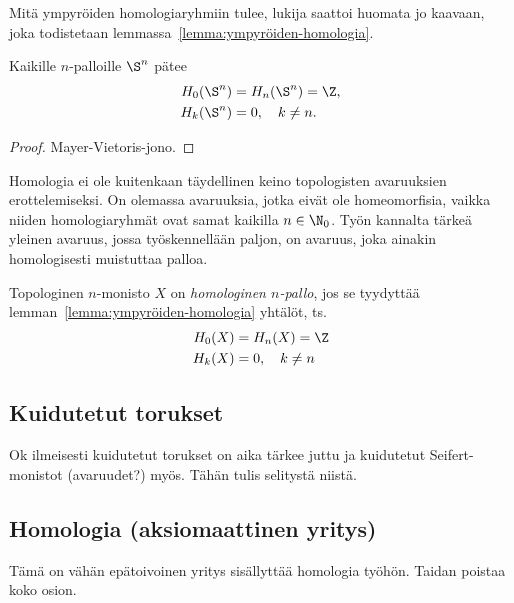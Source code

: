 Mitä ympyröiden homologiaryhmiin tulee, lukija saattoi huomata jo kaavaan, joka todistetaan lemmassa~\ref{lemma:ympyröiden-homologia}.
\begin{lemma}
    \label{lemma:ympyröiden-homologia}
    Kaikille $n$-palloille $\S^n$ pätee
    \begin{align*}
        H_0(\S^n)&=H_n(\S^n)=\Z, \\
        H_k(\S^n)&=0,\quad k\ne n.
    \end{align*}
\end{lemma}
\begin{proof}
    Mayer-Vietoris-jono.
\end{proof}
Homologia ei ole kuitenkaan täydellinen keino topologisten avaruuksien erottelemiseksi. On olemassa avaruuksia, jotka eivät ole homeomorfisia, vaikka niiden homologiaryhmät ovat samat kaikilla $n\in\N_0$. Työn kannalta tärkeä yleinen avaruus, jossa työskennellään paljon, on avaruus, joka ainakin homologisesti muistuttaa palloa.
\begin{maaritelma}
    \label{maar:homologinen-n-pallo}
    Topologinen $n$-monisto $X$ on \emph{homologinen $n$-pallo}, jos se tyydyttää lemman~\ref{lemma:ympyröiden-homologia} yhtälöt, ts.
    \begin{align*}
        H_0(X)&=H_n(X)=\Z \\
        H_k(X)&=0,\quad k\ne n
    \end{align*}
\end{maaritelma}

\subsection{Kuidutetut torukset}
Ok ilmeisesti kuidutetut torukset on aika tärkee juttu ja kuidutetut Seifert-monistot (avaruudet?) myös. Tähän tulis selitystä niistä.

\subsection{Homologia (aksiomaattinen yritys)}
Tämä on vähän epätoivoinen yritys sisällyttää homologia työhön. Taidan poistaa koko osion.

